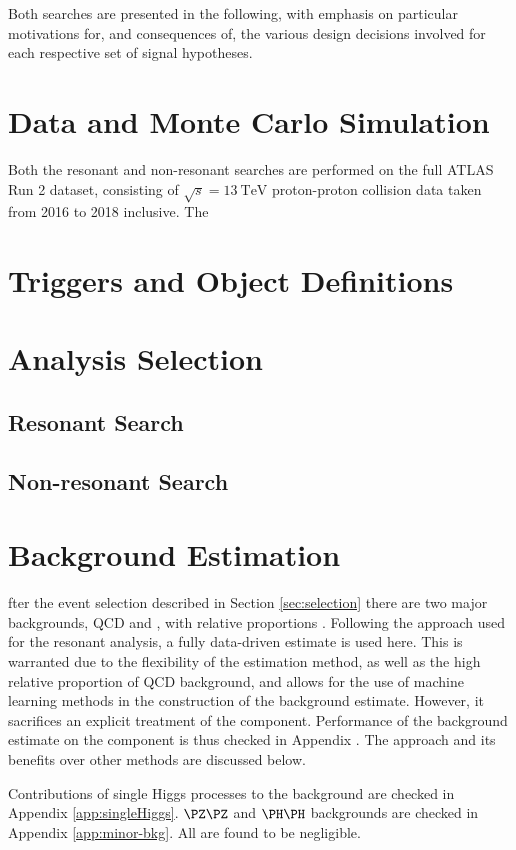 Both searches are presented in the following, with emphasis on particular motivations for, and consequences
of, the various design decisions involved for each respective set of signal hypotheses. 

\section{Data and Monte Carlo Simulation}
Both the resonant and non-resonant searches are performed on the full ATLAS Run 2 dataset, consisting of 
$\sqrt{s} = \SI{13}{\TeV}$ proton-proton collision data taken from 2016 to 2018 inclusive. The 

\section{Triggers and Object Definitions}
\section{Analysis Selection}
\subsection{Resonant Search}
\subsection{Non-resonant Search}
\section{Background Estimation}
fter the event selection described in Section \ref{sec:selection} there are
two major backgrounds, QCD and \ttbar, with relative proportions . Following the approach used for the 
resonant analysis, a fully data-driven estimate is used here. This is warranted due to 
the flexibility of the estimation method, as well as the high relative proportion of 
QCD background, and allows for the use of machine learning methods in the construction of
the background estimate. However, it sacrifices an explicit treatment of the
\ttbar component. Performance of the background estimate on the \ttbar component
is thus checked in Appendix . The approach and
its benefits over other methods are discussed below.

Contributions of single Higgs processes to the background are checked in 
Appendix \ref{app:singleHiggs}. $\PZ\PZ$ and $\higgs\higgs$ backgrounds are checked 
in Appendix \ref{app:minor-bkg}. All are found to be negligible.

